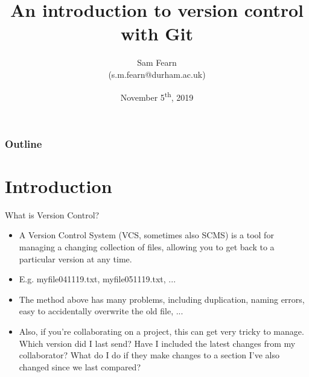 \documentclass{beamer}
\author{Sam Fearn\\{\small 
(s.m.fearn@durham.ac.uk)}}
\title{An introduction to version control with Git}
\date{November 5\textsuperscript{th}, 2019}
\begin{document}
\renewcommand{\d}[2][]{\ensuremath{\operatorname{d}^{#1}\!{#2}}}

{

\begin{frame}[plain]
\maketitle
\end{frame}
}

\begin{frame}
       \frametitle{Outline}
       \tableofcontents
\end{frame}
\section{Introduction} %
\label{sec:intro}

\begin{frame}{What is Version Control?}
	\begin{itemize}
		\item<1-> A Version Control System (VCS, sometimes also SCMS) is a tool for managing a changing collection of files, allowing you to get back to a particular version at any time.
		\item<2-> E.g. myfile041119.txt, myfile051119.txt, ...
		\item<3-> The method above has many problems, including duplication, naming errors, easy to accidentally overwrite the old file, ...
		\item<4-> Also, if you're collaborating on a project, this can get very tricky to manage. Which version did I last send? Have I included the latest changes from my collaborator? What do I do if they make changes to a section I've also changed since we last compared?
	\end{itemize}
\end{frame}
\end{document}
